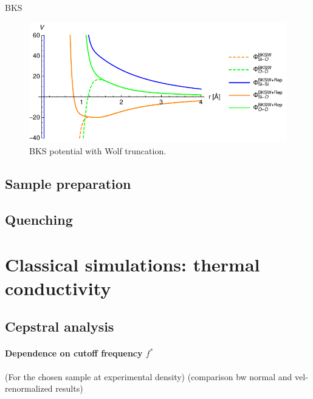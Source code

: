 BKS
\begin{figure}
    \centering
    \includegraphics[]{chapters/chapter6/figures/BKSW.pdf}
    \caption{BKS potential with Wolf truncation.}
    \label{fig:BKS-potential}
\end{figure}

\subsection{Sample preparation}


\subsection{Quenching}

\section{Classical simulations: thermal conductivity}

\subsection{Cepstral analysis}
\paragraph{Dependence on cutoff frequency $f^*$}
(For the chosen sample at experimental density)
(comparison bw normal and vel-renormalized results)


